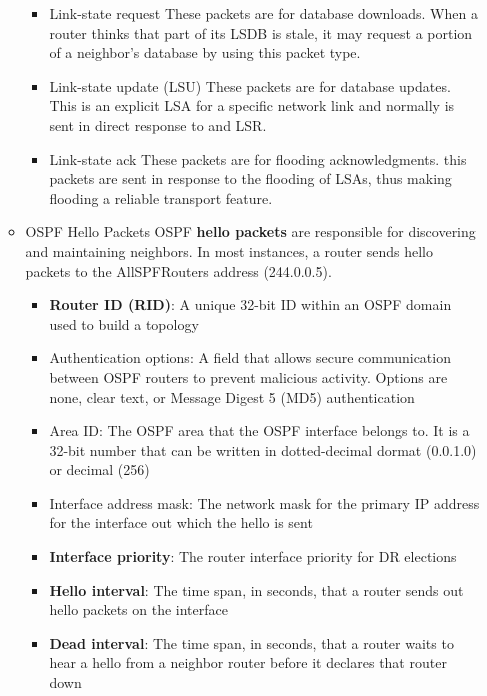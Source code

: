 \documentclass{article}
\begin{document}
\begin{itemize}
\begin{itemize}
\begin{itemize}
					\item Link-state request
						These packets are for database downloads. When a router thinks that part of its LSDB is stale, it may request a portion of a neighbor's database by using this packet type.
			
					\item Link-state update (LSU)
						These packets are for database updates. This is an explicit LSA for a specific network link and normally is sent in direct response to and LSR.

					\item Link-state ack
						These packets are for flooding acknowledgments. this packets are sent in response to the flooding of LSAs, thus making flooding a reliable transport feature.
				\end{itemize}


			\item OSPF Hello Packets
				OSPF \textbf{hello packets} are responsible for discovering and maintaining neighbors. In most instances, a router sends hello packets to the AllSPFRouters address (244.0.0.5).
				\begin{itemize}
					\item \textbf{Router ID (RID)}:
						A unique 32-bit ID within an OSPF domain used to build a topology
					\item Authentication options:
						A field that allows secure communication between OSPF routers to prevent malicious activity. Options are none, clear text, or Message Digest 5 (MD5) authentication
					\item Area ID:
						The OSPF area that the OSPF interface belongs to. It is a 32-bit number that can be written in dotted-decimal dormat (0.0.1.0) or decimal (256)

					\item Interface address mask:
						The network mask for the primary IP address for the interface out which the hello is sent

					\item \textbf{Interface priority}:
						The router interface priority for DR elections

					\item \textbf{Hello interval}:
						The time span, in seconds, that a router sends out hello packets on the interface

					\item \textbf{Dead interval}:
						The time span, in seconds, that a router waits to hear a hello from a neighbor router before it declares that router down


\end{itemize}
\end{itemize}
\end{itemize}
\end{document}

